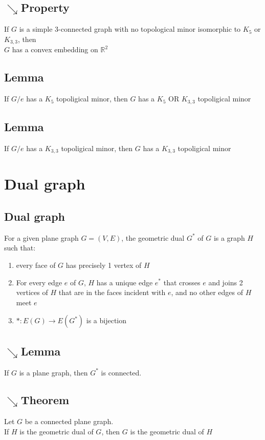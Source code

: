         \subsection{$\searrow$Property}
            If $G$ is a simple 3-connected graph with no topological minor isomorphic to $K_5$ or $K_{3, 3}$, then\\
            $G$ has a convex embedding on $\mathbb{R}^2$
        \subsection{Lemma}
            If $G/e$ has a $K_5$ topoligical minor, then $G$ has a $K_5$ OR $K_{3, 3}$ topoligical minor
        \subsection{Lemma}
        If $G/e$ has a $K_{3, 3}$ topoligical minor, then $G$ has a $K_{3, 3}$ topoligical minor
    \section{Dual graph}
        \subsection{Dual graph}
            For a given plane graph $G=(V, E)$, the geometric dual $G^*$ of $G$ is a graph $H$ such that:
            \begin{enumerate}
                \item every face of $G$ has precisely 1 vertex of $H$
                \item For every edge $e$ of $G$, $H$ has a unique edge $e^*$ that crosses $e$ and joins 2 vertices of $H$ that are in the faces incident with $e$, and no other edges of $H$ meet $e$
                \item $*:E(G)\rightarrow E(G^*)$ is a bijection
            \end{enumerate}
        \subsection{$\searrow$Lemma}
            If $G$ is a plane graph, then $G^*$ is connected.
        \subsection{$\searrow$Theorem}
            Let $G$ be a connected plane graph.\\
            If $H$ is the geometric dual of $G$, then $G$ is the geometric dual of $H$
